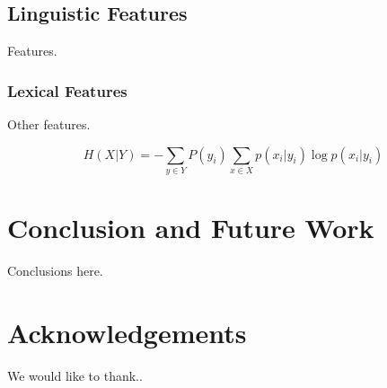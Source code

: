 \documentclass{cys}
\begin{document}
\begin{table}[h!]
    \centering
    \caption{pool - pooled}
\end{table}


\subsection{Linguistic Features}
\label{subsection:linguistic}

Features. 

\subsubsection{Lexical Features}
\label{subsection:lexicalFeatures}

Other features.

\begin{equation}
H(X|Y) = - \sum_{y \in Y} P(y_i) \sum_{x \in X} p(x_i|y_i)\log p(x_i|y_i)
\label{equation:conditionalEntropy1}
\end{equation}


\section{Conclusion and Future Work}
\label{sec:conclusionAndFutureWork}

Conclusions here.

\section{Acknowledgements} 
We would like to thank.. 



\small{


}
\normalsize
\end{document}
